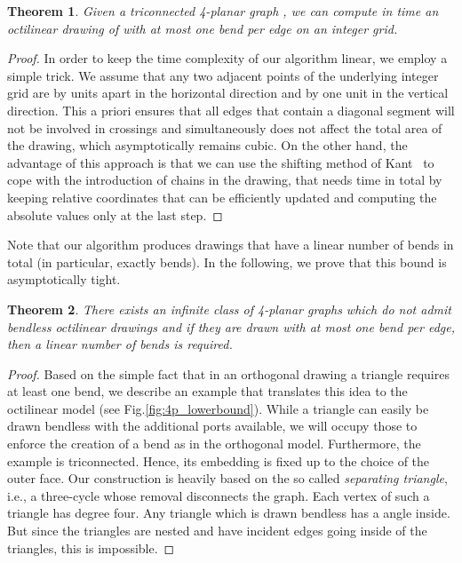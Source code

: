 \documentclass[a4paper,twoside,11pt]{article}
\newtheorem{theorem}{Theorem}
\begin{document}
\begin{theorem}
Given a triconnected 4-planar graph , we can compute in 
time an octilinear drawing of  with at most one bend per edge on
an  integer grid.
\end{theorem}
\begin{proof}
In order to keep the time complexity of our algorithm linear, we
employ a simple trick. We assume that any two adjacent points of the
underlying integer grid are by  units apart in the horizontal
direction and by one unit in the vertical direction. This a priori
ensures that all edges that contain a diagonal segment will not be
involved in crossings and simultaneously does not affect the total
area of the drawing, which asymptotically remains cubic. On the
other hand, the advantage of this approach is that we can use the
shifting method of Kant~\cite{Kant92b} to cope with the introduction
of chains in the drawing, that needs  time in total by keeping
relative coordinates that can be efficiently updated and computing
the absolute values only at the last step.
\end{proof}

Note that our algorithm produces drawings that have a linear number
of bends in total (in particular, exactly  bends). In
the following, we prove that this bound is asymptotically tight.

\begin{theorem}
There exists an infinite class of 4-planar graphs which do not admit
bendless octilinear drawings and if they are drawn with at most one
bend per edge, then a linear number of bends is required.
\end{theorem}
\begin{proof}
Based on the simple fact that in an orthogonal drawing a triangle
requires at least one bend, we describe an example that translates
this idea to the octilinear model (see Fig.\ref{fig:4p_lowerbound}).
While a triangle can easily be drawn bendless with the additional
ports available, we will occupy those to enforce the creation of a
bend as in the orthogonal model. Furthermore, the example is
triconnected. Hence, its embedding is fixed up to the choice of the
outer face. Our construction is heavily based on the so called
\emph{separating triangle}, i.e., a three-cycle whose removal
disconnects the graph. Each vertex of such a triangle has degree
four. Any triangle which is drawn bendless has a  angle
inside. But since the triangles are nested and have incident edges
going inside of the triangles, this is impossible.
\end{proof}
\end{document}
